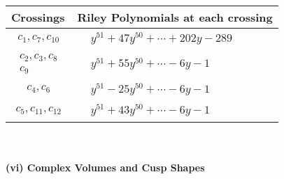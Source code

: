 \documentclass[1p]{elsarticle_modified}
\theoremstyle{definition}
\begin{document}
\begin{tabular}{m{50pt}|m{274pt}}
Crossings & \hspace{64pt}Riley Polynomials at each crossing \\
\hline $$\begin{aligned}c_{1},c_{7},c_{10}\end{aligned}$$&$\begin{aligned}
&y^{51}+47 y^{50}+\cdots+202 y-289
\end{aligned}$\\
\hline $$\begin{aligned}c_{2},c_{3},c_{8}\\c_{9}\end{aligned}$$&$\begin{aligned}
&y^{51}+55 y^{50}+\cdots-6 y-1
\end{aligned}$\\
\hline $$\begin{aligned}c_{4},c_{6}\end{aligned}$$&$\begin{aligned}
&y^{51}-25 y^{50}+\cdots-6 y-1
\end{aligned}$\\
\hline $$\begin{aligned}c_{5},c_{11},c_{12}\end{aligned}$$&$\begin{aligned}
&y^{51}+43 y^{50}+\cdots-6 y-1
\end{aligned}$\\
\hline
\end{tabular}\\~\\
\newpage\flushleft \textbf{(vi) Complex Volumes and Cusp Shapes}
\end{document}
